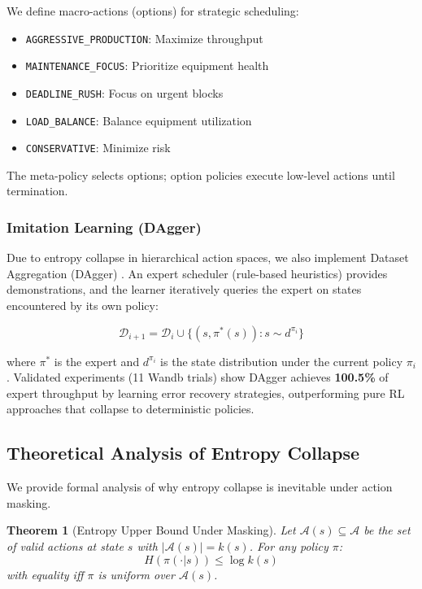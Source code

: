 \documentclass[11pt,a4paper]{article}
\newtheorem{theorem}{Theorem}[section]
\begin{document}
We define macro-actions (options) for strategic scheduling:
\begin{itemize}
    \item \texttt{AGGRESSIVE\_PRODUCTION}: Maximize throughput
    \item \texttt{MAINTENANCE\_FOCUS}: Prioritize equipment health
    \item \texttt{DEADLINE\_RUSH}: Focus on urgent blocks
    \item \texttt{LOAD\_BALANCE}: Balance equipment utilization
    \item \texttt{CONSERVATIVE}: Minimize risk
\end{itemize}

The meta-policy selects options; option policies execute low-level actions until termination.

\subsubsection{Imitation Learning (DAgger)}

Due to entropy collapse in hierarchical action spaces, we also implement Dataset Aggregation (DAgger) \citep{ross2011reduction}. An expert scheduler (rule-based heuristics) provides demonstrations, and the learner iteratively queries the expert on states encountered by its own policy:

\begin{equation}
\mathcal{D}_{i+1} = \mathcal{D}_i \cup \{(s, \pi^*(s)) : s \sim d^{\pi_i}\}
\end{equation}

where $\pi^*$ is the expert and $d^{\pi_i}$ is the state distribution under the current policy $\pi_i$. Validated experiments (11 Wandb trials) show DAgger achieves \textbf{100.5\%} of expert throughput by learning error recovery strategies, outperforming pure RL approaches that collapse to deterministic policies.

\subsection{Theoretical Analysis of Entropy Collapse}
\label{sec:entropy_theory}

We provide formal analysis of why entropy collapse is inevitable under action masking.

\begin{theorem}[Entropy Upper Bound Under Masking]
\label{thm:entropy_bound}
Let $\mathcal{A}(s) \subseteq \mathcal{A}$ be the set of valid actions at state $s$ with $|\mathcal{A}(s)| = k(s)$. For any policy $\pi$:
\begin{equation}
H(\pi(\cdot|s)) \leq \log k(s)
\end{equation}
with equality iff $\pi$ is uniform over $\mathcal{A}(s)$.
\end{theorem}
\end{document}
